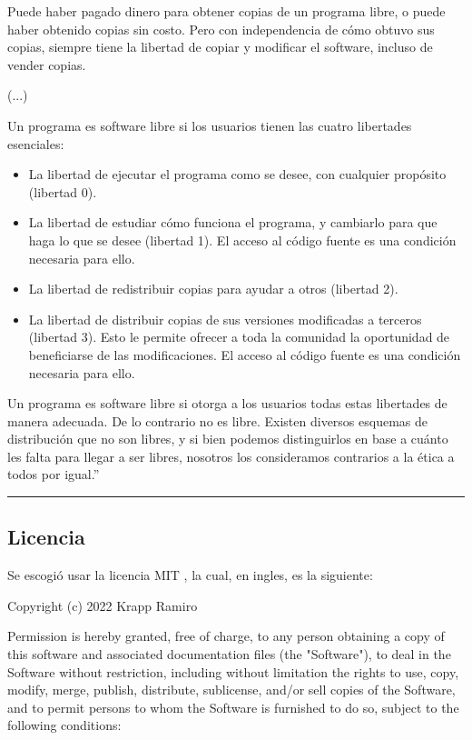 \documentclass[../informe_krapp.tex]{subfiles}
\begin{document}
{Puede haber pagado dinero para obtener copias de un programa libre, o puede haber obtenido copias sin costo. Pero con independencia de cómo obtuvo sus copias, siempre tiene la libertad de copiar y modificar el software, incluso de vender copias.

(...)

Un programa es software libre si los usuarios tienen las cuatro libertades esenciales:
\begin{itemize}
	\item La libertad de ejecutar el programa como se desee, con cualquier propósito (libertad 0).
	\item La libertad de estudiar cómo funciona el programa, y cambiarlo para que haga lo que se desee (libertad 1). El acceso al código fuente es una condición necesaria para ello.
	\item La libertad de redistribuir copias para ayudar a otros (libertad 2).
	\item La libertad de distribuir copias de sus versiones modificadas a terceros (libertad 3). Esto le permite ofrecer a toda la comunidad la oportunidad de beneficiarse de las modificaciones. El acceso al código fuente es una condición necesaria para ello.
\end{itemize}

Un programa es software libre si otorga a los usuarios todas estas libertades de manera adecuada. De lo contrario no es libre. Existen diversos esquemas de distribución que no son libres, y si bien podemos distinguirlos en base a cuánto les falta para llegar a ser libres, nosotros los consideramos contrarios a la ética a todos por igual.''
\begin{center}
	\rule{0.8\textwidth}{0.3pt}
\end{center}

\clearpage

\subsection{Licencia}
Se escogió usar la licencia MIT \cite{mit}, la cual, en ingles, es la siguiente:

Copyright (c) 2022 Krapp Ramiro

Permission is hereby granted, free of charge, to any person obtaining a copy
of this software and associated documentation files (the "Software"), to deal
in the Software without restriction, including without limitation the rights
to use, copy, modify, merge, publish, distribute, sublicense, and/or sell
copies of the Software, and to permit persons to whom the Software is
furnished to do so, subject to the following conditions:

}
\end{document}
